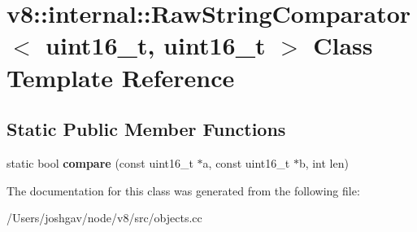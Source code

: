 \hypertarget{classv8_1_1internal_1_1_raw_string_comparator_3_01uint16__t_00_01uint16__t_01_4}{}\section{v8\+:\+:internal\+:\+:Raw\+String\+Comparator$<$ uint16\+\_\+t, uint16\+\_\+t $>$ Class Template Reference}
\label{classv8_1_1internal_1_1_raw_string_comparator_3_01uint16__t_00_01uint16__t_01_4}
\subsection*{Static Public Member Functions}
\begin{DoxyCompactItemize}
\item 
static bool {\bfseries compare} (const uint16\+\_\+t $\ast$a, const uint16\+\_\+t $\ast$b, int len)\hypertarget{classv8_1_1internal_1_1_raw_string_comparator_3_01uint16__t_00_01uint16__t_01_4_ab0afdcfb4e2f09e9c15e2aa8e5d4e8b5}{}\label{classv8_1_1internal_1_1_raw_string_comparator_3_01uint16__t_00_01uint16__t_01_4_ab0afdcfb4e2f09e9c15e2aa8e5d4e8b5}

\end{DoxyCompactItemize}


The documentation for this class was generated from the following file\+:\begin{DoxyCompactItemize}
\item 
/\+Users/joshgav/node/v8/src/objects.\+cc\end{DoxyCompactItemize}
